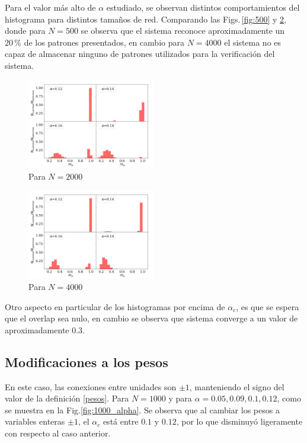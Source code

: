 Para el valor más alto de $\alpha$ estudiado, se observan distintos comportamientos del histograma para distintos tamaños de red. Comparando las Figs.\,\ref{fig:500} y \ref{fig:4000}, donde para $N=500$ se observa que el sistema reconoce aproximadamente un $20\,\%$ de los patrones presentados, en cambio para $N=4000$ el sistema no es capaz de almacenar ninguno de  patrones utilizados para la verificación del sistema.
\begin{figure}[H]
	\centering
	\includegraphics[width=0.5\textwidth]{../Graficos/2000.png}
	\caption{Para $N=2000$}
	\label{fig:2000}
\end{figure}
\begin{figure}[H]
	\centering
	\includegraphics[width=0.5\textwidth]{../Graficos/4000.png}
	\caption{Para $N=4000$}
	\label{fig:4000}
\end{figure}

Otro aspecto en particular de los histogramas por encima de $\alpha_c$, es que se espera que el overlap sea nulo, en cambio se observa que sistema converge a un valor de aproximadamente $0.3$. 

\subsection{Modificaciones a los pesos}
En este caso, las conexiones entre unidades son $\pm 1$, manteniendo el signo del valor de la definición \ref{pesos}.  Para $N=1000$ y para $\alpha= 0.05, 0.09, 0.1, 0.12$, como se muestra en la Fig.\ref{fig:1000_alpha}. Se observa que al cambiar los pesos a variables enteras $\pm 1$, el $\alpha_c$ está entre $0.1$ y $0.12$, por lo que disminuyó ligeramente con respecto al caso anterior.

